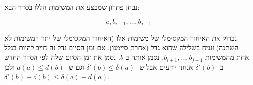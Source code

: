 נבחן פתרון שמבצע את המשימות הללו בסדר הבא:

$$
a, b_{i + 1}, \ldots, b_{j - 1}
$$

נבדוק את האיחור המקסימלי של משימות אלו (האיחור המקסימלי של יתר המשימות לא השתנה) 
ונניח בשלילה שהוא גדל (אחרת סיימנו). 
אם זמן הסיום גדל זה חייב להיות בגלל אחת מהמשימות 
$b_{i+1}, \ldots, b_{j - 1}$,
נסמן אותה ב-$b$. נסמן את זמן הסיום שלה לפי הסדר החדש ב-%
$\delta'(b)$
אנחנו יודעים אבל ש-%
$\delta'(b) \leq \delta(a)$
וגם ש-%
$d(a) \leq d(b)$
ולכן
$\delta'(b) - d(b) \leq \delta(a) - d(a)$.

